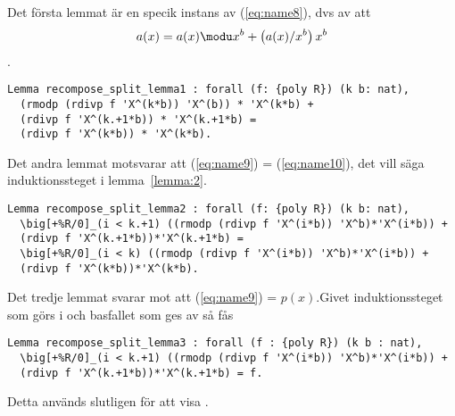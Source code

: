 Det första lemmat  är en specik instans av
(\ref{eq:name8}), dvs av att
\begin{align*}
 a(x)= a(x)  \modu x^b + \left(a(x)/x^b\right) x^b
\end{align*}.
\begin{lstlisting}
Lemma recompose_split_lemma1 : forall (f: {poly R}) (k b: nat),
  (rmodp (rdivp f 'X^(k*b)) 'X^(b)) * 'X^(k*b) +
  (rdivp f 'X^(k.+1*b)) * 'X^(k.+1*b) =
  (rdivp f 'X^(k*b)) * 'X^(k*b).
\end{lstlisting}
Det andra lemmat motsvarar att (\ref{eq:name9}) = (\ref{eq:name10}), det vill
säga induktionssteget i lemma~\ref{lemma:2}.
\begin{lstlisting}
Lemma recompose_split_lemma2 : forall (f: {poly R}) (k b: nat),
  \big[+%R/0]_(i < k.+1) ((rmodp (rdivp f 'X^(i*b)) 'X^b)*'X^(i*b)) +
  (rdivp f 'X^(k.+1*b))*'X^(k.+1*b) =
  \big[+%R/0]_(i < k) ((rmodp (rdivp f 'X^(i*b)) 'X^b)*'X^(i*b)) +
  (rdivp f 'X^(k*b))*'X^(k*b).
\end{lstlisting}
Det tredje lemmat svarar mot att (\ref{eq:name9}) = $p(x)$.Givet
induktionssteget som görs i  och basfallet som ges av
 så fås
\begin{lstlisting}
Lemma recompose_split_lemma3 : forall (f : {poly R}) (k b : nat),
  \big[+%R/0]_(i < k.+1) ((rmodp (rdivp f 'X^(i*b)) 'X^b)*'X^(i*b)) +
  (rdivp f 'X^(k.+1*b))*'X^(k.+1*b) = f.
\end{lstlisting}
Detta används slutligen för att visa .
